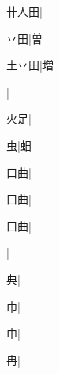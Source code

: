 \begin{multicols}{2}
{{\cjk{}卄人田}\mktsJzrVerticalBar{}{\cjk{}{\cnsym{}　}{\cnsym{}　}{\cnsym{}　}}|{}\par
{\cjk{}{\cnsym{}　}丷田}\mktsJzrVerticalBar{}{\cjk{}{\cnsym{}　}{\cnsym{}　}{\cnsym{}　}}|{\cjk{}曽}\par
{\cjk{}土丷田}\mktsJzrVerticalBar{}{\cjk{}{\cnsym{}　}{\cnsym{}　}{\cnsym{}　}}|{\cjk{}増}\par
{}\mktsJzrVerticalBar{}{\cjk{}{\cnsym{}　}{\cnsym{}　}{\cnsym{}　}}|{}\par
{\cjk{}{\cnsym{}　}火足}\mktsJzrVerticalBar{}{\cjk{}{\cnsym{}　}{\cnsym{}　}{\cnsym{}　}}|{}\par
{\cjk{}{\cnsym{}　}{\cnsym{}　}虫}\mktsJzrVerticalBar{}{\cjk{}{\cnsym{}　}{\cnsym{}　}{\cnsym{}　}}|{\cjk{}蚎}\par
{口曲}\mktsJzrVerticalBar{}{\cjk{}{\cnsym{}　}{\cnsym{}　}{\cnsym{}　}}|{}\par
{口曲}\mktsJzrVerticalBar{}{\cjk{}{\cnsym{}　}{\cnsym{}　}{\cnsym{}　}}|{}\par
{口曲}\mktsJzrVerticalBar{}{\cjk{}{\cnsym{}　}{\cnsym{}　}{\cnsym{}　}}|{}\par
{}\mktsJzrVerticalBar{}{\cjk{}{\cnsym{}　}{\cnsym{}　}{\cnsym{}　}}|{}\par
{\cjk{}{\cnsym{}　}{\cnsym{}　}典}\mktsJzrVerticalBar{}{\cjk{}{\cnsym{}　}{\cnsym{}　}{\cnsym{}　}}|{}\par
{\cjk{}{\cnsym{}　}{\cnsym{}　}巾}\mktsJzrVerticalBar{}{\cjk{}{\cnsym{}　}{\cnsym{}　}{\cnsym{}　}}|{}\par
{巾}\mktsJzrVerticalBar{}{\cjk{}{\cnsym{}　}{\cnsym{}　}{\cnsym{}　}}|{}\par
{\cjk{}{\cnsym{}　}{\cnsym{}　}冉}\mktsJzrVerticalBar{}{\cjk{}{\cnsym{}　}{\cnsym{}　}{\cnsym{}　}}|{}\par
}
\end{multicols}
